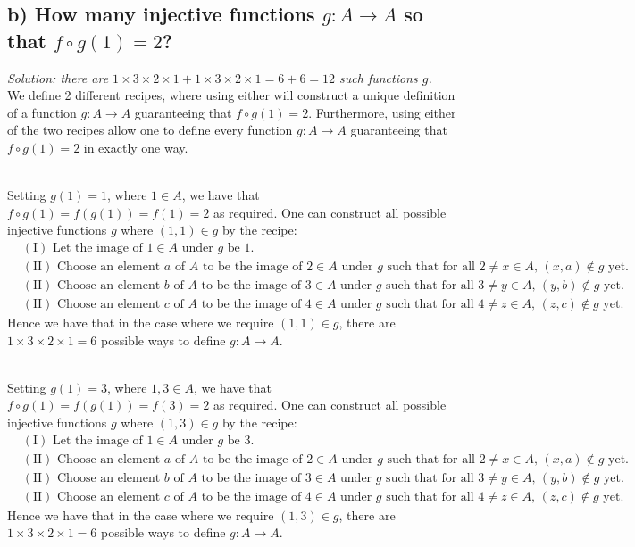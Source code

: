 \documentclass[11pt, letterpaper]{article}
\begin{document}
\subsection*{b) How many injective functions $g:A\rightarrow A$ so that $f\circ g(1)=2$?}
{\large\it Solution: there are $1\times 3\times 2\times 1 + 1\times 3\times 2\times 1=6+6=12$ such functions $g$.}\\[0.25cm]
We define 2 different recipes, where using either will construct a unique definition of a function $g:A\rightarrow A$ guaranteeing that $f\circ g(1)=2$.
Furthermore, using either of the two recipes allow one to define every function $g:A\rightarrow A$ guaranteeing that $f\circ g(1)=2$ in exactly one way. 
\begin{recipe}~\\
    Setting $g(1)=1$, where $1\in A$, we have that $f\circ g(1)=f(g(1))=f(1)=2$ as required. One can construct all possible injective functions $g$ where $(1,1)\in g$ by the recipe:
    \begin{align*}
       &(\text{I}) \text{ Let the image of $1\in A$ under $g$ be 1.}\\ 
       &(\text{II}) \text{ Choose an element $a$ of $A$ to be the image of $2\in A$ under $g$ such that for all $2\neq x\in A$, $(x,a)\notin g$ yet.}\\ 
       &(\text{II}) \text{ Choose an element $b$ of $A$ to be the image of $3\in A$ under $g$ such that for all $3\neq y\in A$, $(y,b)\notin g$ yet.}\\ 
       &(\text{II}) \text{ Choose an element $c$ of $A$ to be the image of $4\in A$ under $g$ such that for all $4\neq z\in A$, $(z,c)\notin g$ yet.} 
    \end{align*}
    Hence we have that in the case where we require $(1,1)\in g$, there are $1\times 3\times 2\times 1=6$ possible ways to define $g:A\rightarrow A$.
\end{recipe}
\begin{recipe}~\\
    Setting $g(1)=3$, where $1,3\in A$, we have that $f\circ g(1)=f(g(1))=f(3)=2$ as required. One can construct all possible injective functions $g$ where $(1,3)\in g$ by the recipe:
    \begin{align*}
       &(\text{I}) \text{ Let the image of $1\in A$ under $g$ be 3.}\\ 
       &(\text{II}) \text{ Choose an element $a$ of $A$ to be the image of $2\in A$ under $g$ such that for all $2\neq x\in A$, $(x,a)\notin g$ yet.}\\ 
       &(\text{II}) \text{ Choose an element $b$ of $A$ to be the image of $3\in A$ under $g$ such that for all $3\neq y\in A$, $(y,b)\notin g$ yet.}\\ 
       &(\text{II}) \text{ Choose an element $c$ of $A$ to be the image of $4\in A$ under $g$ such that for all $4\neq z\in A$, $(z,c)\notin g$ yet.} 
    \end{align*}
    Hence we have that in the case where we require $(1,3)\in g$, there are $1\times 3\times 2\times 1=6$ possible ways to define $g:A\rightarrow A$.
\end{recipe}
\end{document}
